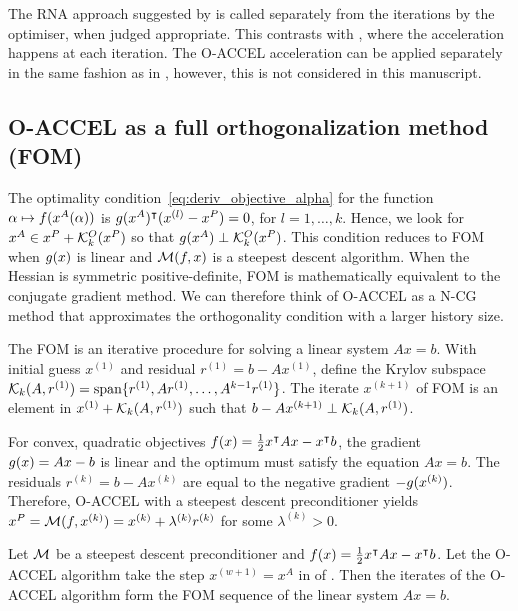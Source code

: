 \documentclass[main.tex]{subfiles}
\begin{document}
\begin{remark}
  The RNA approach suggested by \citet{damien2016regularized} is
  called separately from the iterations by the optimiser, when judged
  appropriate. This contrasts with , where the
  acceleration happens at each iteration.  The O-ACCEL acceleration
  can be applied separately in the same fashion as in
  \citet{damien2016regularized}, however, this is not considered in
  this manuscript.
\end{remark}

\subsection{O-ACCEL as a full orthogonalization method (FOM)}
The optimality condition~\eqref{eq:deriv_objective_alpha} for the
function $\alpha\mapsto f(x^A(\alpha))$ is
$g(x^A)^\intercal(x^{(l)}-x^P)=0$, for $l=1,\dots,k$.  Hence, we
look for $x^A\in x^P+\mathcal{K}_{k}^O(x^P)$ so that
$g(x^A)\perp \mathcal{K}_{k}^O(x^P)$.  This condition reduces to FOM
\citep{saad2003iterative} when $g(x)$ is linear and
$\mathcal{M}(f,x)$ is a steepest descent algorithm.  When the Hessian
is symmetric positive-definite, FOM is mathematically equivalent to
the conjugate gradient method. We can therefore think of O-ACCEL as a
N-CG method that approximates the orthogonality condition with a
larger history size.

The FOM is an iterative procedure for solving a linear system $Ax=b$.
With initial guess $x^{(1)}$ and residual $r^{(1)}=b-Ax^{(1)}$, define
the Krylov subspace
$\mathcal{K}_{k}(A,r^{(1)})=\mbox{span} \{r^{(1)},Ar^{(1)},\dots,A^{k-1}r^{(1)}\}$.
The iterate $x^{(k+1)}$ of FOM is an element in $x^{(1)}+\mathcal{K}_{k}(A,r^{(1)})$
such that $b-Ax^{(k+1)}\perp \mathcal{K}_{k}(A,r^{(1)})$.

For convex, quadratic objectives
$f(x)=\frac{1}{2}x^\intercal Ax-x^\intercal b$, the gradient
$g(x)=Ax-b$ is linear and the optimum must satisfy the equation
$Ax=b$.  The residuals $r^{(k)}=b-Ax^{(k)}$ are equal to the negative
gradient $-g(x^{(k)})$. Therefore, O-ACCEL with a steepest descent
preconditioner yields
$x^P = \mathcal{M}(f,x^{(k)}) = x^{(k)}+\lambda^{(k)}r^{(k)}$ for some
$\lambda^{(k)}>0$.

\begin{theorem}\label{thm:oaccel_fom}
  Let $\mathcal{M}$ be a steepest descent preconditioner and
  $f(x)=\frac{1}{2}x^\intercal Ax-x^\intercal b$.  Let the
  O-ACCEL algorithm take the step $x^{(w+1)}=x^A$ in
   of .  Then the iterates of
  the O-ACCEL algorithm form the FOM sequence of the linear system
  $Ax=b$.
\end{theorem}
\end{document}

